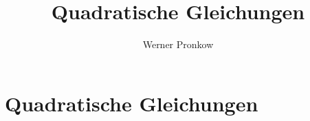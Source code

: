\documentclass[fontsize=11pt]{scrartcl}
\begin{document}
\title{Quadratische Gleichungen}
\author{Werner Pronkow}
\section*{Quadratische Gleichungen}
\pagestyle{empty}
\enlargethispage{2cm}
\end{document}
